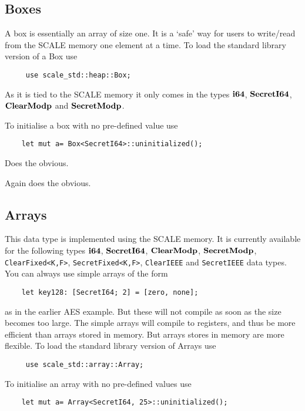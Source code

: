 

\subsection{Boxes}
A box is essentially an array of size one. It is a `safe' way for users
to write/read from the SCALE memory one element at a time.
To load the standard library version of a Box use
\begin{lstlisting}
     use scale_std::heap::Box;
\end{lstlisting}
As it is tied to the SCALE memory it only comes in the
types  $\mathbf{i64}$, $\mathbf{SecretI64}$, $\mathbf{ClearModp}$ and $\mathbf{SecretModp}$.

To initialise a box with no pre-defined value use
\begin{lstlisting}
    let mut a= Box<SecretI64>::uninitialized();
\end{lstlisting}

Does the obvious.

Again does the obvious.


\subsection{Arrays}
This data type is implemented using the SCALE memory.
It is currently available for the following types
$\mathbf{i64}$, $\mathbf{SecretI64}$, $\mathbf{ClearModp}$, $\mathbf{SecretModp}$,
\verb|ClearFixed<K,F>|, \verb|SecretFixed<K,F>|,
\verb|ClearIEEE| and \verb|SecretIEEE|
data types.
You can always use simple arrays of the form
\begin{lstlisting}
    let key128: [SecretI64; 2] = [zero, none];
\end{lstlisting}
as in the earlier AES example. But these will not compile as
soon as the size becomes too large. The simple arrays will
compile to registers, and thus be more efficient than arrays
stored in memory. But arrays stores in memory are more flexible.
To load the standard library version of Arrays use
\begin{lstlisting}
     use scale_std::array::Array;
\end{lstlisting}

To initialise an array with no pre-defined values use
\begin{lstlisting}
    let mut a= Array<SecretI64, 25>::uninitialized();
\end{lstlisting}


